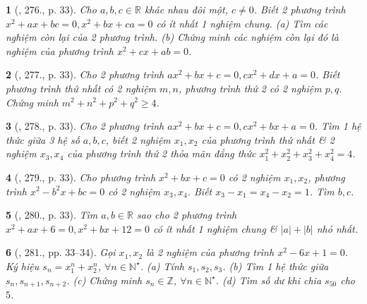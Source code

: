 \documentclass{article}
\newtheorem{baitoan}{}
\begin{document}
\begin{baitoan}[\cite{Binh_Toan_9_tap_2}, 276., p. 33]
	Cho $a,b,c\in\mathbb{R}$ khác nhau đôi một, $c\ne0$. Biết 2 phương trình $x^2 + ax + bc = 0,x^2 + bx + ca = 0$ có ít nhất 1 nghiệm chung. (a) Tìm các nghiệm còn lại của 2 phương trình. (b) Chứng minh các nghiệm còn lại đó là nghiệm của phương trình $x^2 + cx + ab = 0$.
\end{baitoan}

\begin{baitoan}[\cite{Binh_Toan_9_tap_2}, 277., p. 33]
	Cho 2 phương trình $ax^2 + bx + c = 0,cx^2 + dx + a = 0$. Biết phương trình thứ nhất có 2 nghiệm $m,n$, phương trình thứ 2 có 2 nghiệm $p,q$. Chứng minh $m^2 + n^2 + p^2 + q^2\ge4$.
\end{baitoan}

\begin{baitoan}[\cite{Binh_Toan_9_tap_2}, 278., p. 33]
	Cho 2 phương trình $ax^2 + bx + c = 0,cx^2 + bx + a = 0$. Tìm 1 hệ thức giữa 3 hệ số $a,b,c$, biết 2 nghiệm $x_1,x_2$ của phương trình thứ nhất \& 2 nghiệm $x_3,x_4$ của phương trình thứ 2 thỏa mãn đẳng thức $x_1^2 + x_2^2 + x_3^2 + x_4^2 = 4$.
\end{baitoan}

\begin{baitoan}[\cite{Binh_Toan_9_tap_2}, 279., p. 33]
	Cho phương trình $x^2 + bx + c = 0$ có 2 nghiệm $x_1,x_2$, phương trình $x^2 - b^2x + bc = 0$ có 2 nghiệm $x_3,x_4$. Biết $x_3 - x_1 = x_4 - x_2 = 1$. Tìm $b,c$.
\end{baitoan}

\begin{baitoan}[\cite{Binh_Toan_9_tap_2}, 280., p. 33]
	Tìm $a,b\in\mathbb{R}$ sao cho 2 phương trình $x^2 + ax + 6 = 0,x^2 + bx + 12 = 0$ có ít nhất 1 nghiệm chung \& $|a| + |b|$ nhỏ nhất.
\end{baitoan}

\begin{baitoan}[\cite{Binh_Toan_9_tap_2}, 281., pp. 33--34]
	Gọi $x_1,x_2$ là 2 nghiệm của phương trình $x^2 - 6x + 1 = 0$. Ký hiệu $s_n = x_1^n + x_2^n$, $\forall n\in\mathbb{N}^\star$. (a) Tính $s_1,s_2,s_3$. (b) Tìm 1 hệ thức giữa $s_n,s_{n+1},s_{n+2}$. (c) Chứng minh $s_n\in\mathbb{Z}$, $\forall n\in\mathbb{N}^\star$. (d) Tìm số dư khi chia $s_{50}$ cho $5$.
\end{baitoan}

\end{document}
